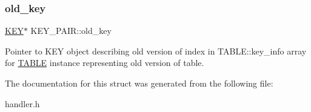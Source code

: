 \subsubsection{\texorpdfstring{old\+\_\+key}{old\_key}}
{\footnotesize\ttfamily \mbox{\hyperlink{structst__key}{K\+EY}}$\ast$ K\+E\+Y\+\_\+\+P\+A\+I\+R\+::old\+\_\+key}

Pointer to K\+EY object describing old version of index in T\+A\+B\+L\+E\+::key\+\_\+info array for \mbox{\hyperlink{structTABLE}{T\+A\+B\+LE}} instance representing old version of table. 

The documentation for this struct was generated from the following file\+:\begin{DoxyCompactItemize}
\item 
handler.\+h\end{DoxyCompactItemize}
